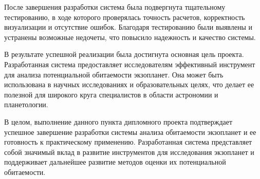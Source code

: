 После завершения разработки система была подвергнута тщательному тестированию, в ходе которого проверялась точность расчетов, корректность визуализации и отсутствие ошибок. Благодаря тестированию были выявлены и устранены возможные недочеты, что повысило надежность и качество системы.

В результате успешной реализации была достигнута основная цель проекта. Разработанная система предоставляет исследователям эффективный инструмент для анализа потенциальной обитаемости экзопланет. Она может быть использована в научных исследованиях и образовательных целях, что делает ее полезной для широкого круга специалистов в области астрономии и планетологии.

В целом, выполнение данного пункта дипломного проекта подтверждает успешное завершение разработки системы анализа обитаемости экзопланет и ее готовность к практическому применению. Разработанная система представляет собой значимый вклад в развитие инструментов для исследования экзопланет и поддерживает дальнейшее развитие методов оценки их потенциальной обитаемости. 